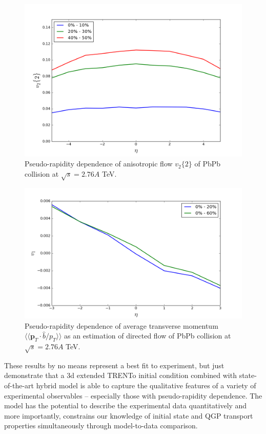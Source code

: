 \documentclass[aps,prl,twocolumn,groupedaddress]{revtex4-1}
\begin{document}
	\begin{figure}
  	\centering
	\includegraphics[width=\columnwidth]{pics/new-PbPb-vnm-eta-p1.png}
	\caption{Pseudo-rapidity dependence of anisotropic flow $v_2\{2\}$ of PbPb collision at $\sqrt{s} = 2.76 A$ TeV.}
  	\label{PbPb-vn-eta-calc}
	\end{figure}
	
	\begin{figure}
  	\centering
	\includegraphics[width=\columnwidth]{pics/RUN-1-PbPb-v1-eta.png}
	\caption{Pseudo-rapidity dependence of average transverse momentum $\langle\langle \mathbf{p}_T\cdot \hat{b}/p_T\rangle\rangle$ as an estimation of directed flow of PbPb collision at $\sqrt{s} = 2.76 A$ TeV.}
  	\label{RUN-1-PbPb-v1-eta}
	\end{figure}
	
	These results by no means represent a best fit to experiment, but just demonstrate that a 3d extended TRENTo initial condition combined with state-of-the-art hybrid model is able to capture the qualitative features of a variety of experimental observables -- especially those with pseudo-rapidity dependence.
	The model has the potential to describe the experimental data quantitatively and more importantly, constrains our knowledge of initial state and QGP transport properties simultaneously through model-to-data comparison.
	
\end{document}
